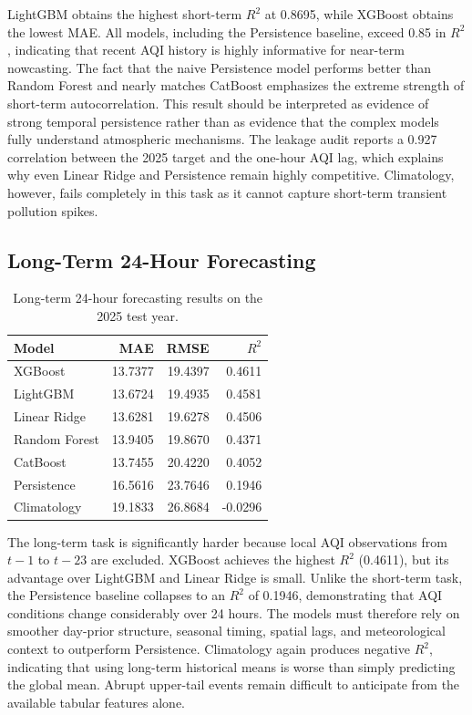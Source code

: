 \documentclass[11pt,a4paper]{article}
\begin{document}
LightGBM obtains the highest short-term $R^2$ at 0.8695, while XGBoost obtains the lowest MAE. All models, including the Persistence baseline, exceed 0.85 in $R^2$, indicating that recent AQI history is highly informative for near-term nowcasting. The fact that the naive Persistence model performs better than Random Forest and nearly matches CatBoost emphasizes the extreme strength of short-term autocorrelation. This result should be interpreted as evidence of strong temporal persistence rather than as evidence that the complex models fully understand atmospheric mechanisms. The leakage audit reports a 0.927 correlation between the 2025 target and the one-hour AQI lag, which explains why even Linear Ridge and Persistence remain highly competitive. Climatology, however, fails completely in this task as it cannot capture short-term transient pollution spikes.

\subsection{Long-Term 24-Hour Forecasting}
\begin{table}[H]
\centering
\caption{Long-term 24-hour forecasting results on the 2025 test year.}
\label{tab:long-results}
\begin{tabular}{lrrr}
\toprule
Model & MAE & RMSE & $R^2$ \\
\midrule
XGBoost & 13.7377 & 19.4397 & 0.4611 \\
LightGBM & 13.6724 & 19.4935 & 0.4581 \\
Linear Ridge & 13.6281 & 19.6278 & 0.4506 \\
Random Forest & 13.9405 & 19.8670 & 0.4371 \\
CatBoost & 13.7455 & 20.4220 & 0.4052 \\
Persistence & 16.5616 & 23.7646 & 0.1946 \\
Climatology & 19.1833 & 26.8684 & -0.0296 \\
\bottomrule
\end{tabular}
\end{table}
\FloatBarrier

The long-term task is significantly harder because local AQI observations from $t-1$ to $t-23$ are excluded. XGBoost achieves the highest $R^2$ (0.4611), but its advantage over LightGBM and Linear Ridge is small. Unlike the short-term task, the Persistence baseline collapses to an $R^2$ of 0.1946, demonstrating that AQI conditions change considerably over 24 hours. The models must therefore rely on smoother day-prior structure, seasonal timing, spatial lags, and meteorological context to outperform Persistence. Climatology again produces negative $R^2$, indicating that using long-term historical means is worse than simply predicting the global mean. Abrupt upper-tail events remain difficult to anticipate from the available tabular features alone.
\end{document}
